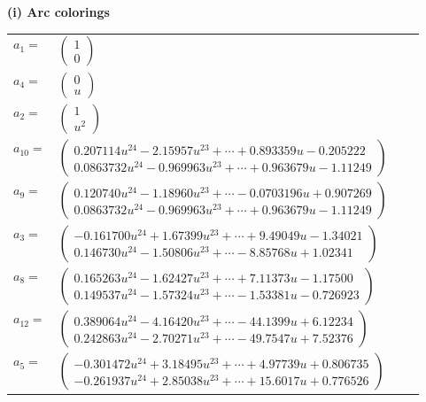\documentclass[1p]{elsarticle_modified}
\theoremstyle{definition}
\begin{document}
\flushleft \textbf{(i) Arc colorings}\\
\begin{tabular}{m{7pt} m{180pt} m{7pt} m{180pt} }
\flushright $a_{1}=$&$\begin{pmatrix}1\\0\end{pmatrix}$ \\
\flushright $a_{4}=$&$\begin{pmatrix}0\\u\end{pmatrix}$ \\
\flushright $a_{2}=$&$\begin{pmatrix}1\\u^2\end{pmatrix}$ \\
\flushright $a_{10}=$&$\begin{pmatrix}0.207114 u^{24}-2.15957 u^{23}+\cdots+0.893359 u-0.205222\\0.0863732 u^{24}-0.969963 u^{23}+\cdots+0.963679 u-1.11249\end{pmatrix}$ \\
\flushright $a_{9}=$&$\begin{pmatrix}0.120740 u^{24}-1.18960 u^{23}+\cdots-0.0703196 u+0.907269\\0.0863732 u^{24}-0.969963 u^{23}+\cdots+0.963679 u-1.11249\end{pmatrix}$ \\
\flushright $a_{3}=$&$\begin{pmatrix}-0.161700 u^{24}+1.67399 u^{23}+\cdots+9.49049 u-1.34021\\0.146730 u^{24}-1.50806 u^{23}+\cdots-8.85768 u+1.02341\end{pmatrix}$ \\
\flushright $a_{8}=$&$\begin{pmatrix}0.165263 u^{24}-1.62427 u^{23}+\cdots+7.11373 u-1.17500\\0.149537 u^{24}-1.57324 u^{23}+\cdots-1.53381 u-0.726923\end{pmatrix}$ \\
\flushright $a_{12}=$&$\begin{pmatrix}0.389064 u^{24}-4.16420 u^{23}+\cdots-44.1399 u+6.12234\\0.242863 u^{24}-2.70271 u^{23}+\cdots-49.7547 u+7.52376\end{pmatrix}$ \\
\flushright $a_{5}=$&$\begin{pmatrix}-0.301472 u^{24}+3.18495 u^{23}+\cdots+4.97739 u+0.806735\\-0.261937 u^{24}+2.85038 u^{23}+\cdots+15.6017 u+0.776526\end{pmatrix}$ \\

\end{tabular}
\end{document}

